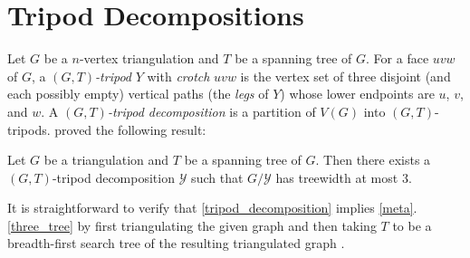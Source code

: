 \documentclass{patmorin}
\begin{document}
%

\section{Tripod Decompositions}

Let $G$ be a $n$-vertex triangulation and $T$ be a spanning tree of $G$. For a face $uvw$ of $G$, a \emph{$(G,T)$-tripod} $Y$ with \emph{crotch} $uvw$ is the vertex set of three disjoint (and each possibly empty) vertical paths (the \emph{legs} of $Y$) whose lower endpoints are $u$, $v$, and $w$.  A \emph{$(G,T)$-tripod decomposition} is a partition of $V(G)$ into $(G,T)$-tripods.  \citet{dujmovic.joret.ea:planar} proved the following result:

\begin{thm}\label{tripod_decomposition}
  Let $G$ be a triangulation and $T$ be a spanning tree of $G$.  Then there exists a $(G,T)$-tripod decomposition $\mathcal{Y}$ such that $G/\mathcal{Y}$ has treewidth at most $3$.
\end{thm}

It is straightforward to verify that \cref{tripod_decomposition} implies \cref{meta}.\ref{three_tree} by first triangulating the given graph and then taking $T$ to be a breadth-first search tree of the resulting triangulated graph \cite[Observation~35]{dujmovic.joret.ea:planar}.
\end{document}
